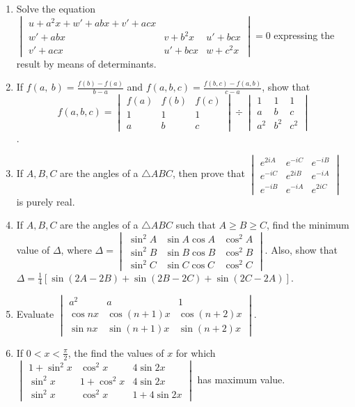 \begin{enumerate}[resume]
\item Solve the equation $\begin{vmatrix}u + a^2x + w' + abx + v' + acx\\w' + abx & v + b^2x & u' + bcx\\ v' + acx & u' + bcx & w
  + c^2x\end{vmatrix} = 0$ expressing the result by means of determinants.
\item If $f(a,\ b) = \frac{f(b) - f(a)}{b - a}$ and $f(a, b, c) = \frac{f(b, c) - f(a, b)}{c - a}$, show that $$f(a, b, c)
  = \begin{vmatrix}f(a) & f(b) & f(c)\\1 & 1 & 1\\a & b & c\end{vmatrix}\div\begin{vmatrix}1 & 1 & 1\\a & b & c\\a^2 & b^2 &
    c^2\end{vmatrix}$$.
\item If $A, B, C$ are the angles of a $\triangle ABC$, then prove that $\begin{vmatrix}e^{2iA} & e^{-iC} & e^{-iB}\\e^{-iC} &
  e^{2iB} & e^{-iA}\\e^{-iB} & e^{-iA} & e^{2iC}\end{vmatrix}$ is purely real.
\item If $A, B, C$ are the angles of a $\triangle ABC$ such that $A\geq B\geq C$, find the minimum value of $\Delta$, where
  $\Delta = \begin{vmatrix}\sin^2A & \sin A\cos A & \cos^2A\\\sin^2B & \sin B\cos B & \cos^2B\\\sin^2C & \sin C\cos C &
  \cos^2C\end{vmatrix}$. Also, show that $\Delta = \frac{1}{4}[\sin(2A - 2B) + \sin(2B - 2C) + \sin(2C - 2A)]$.
\item Evaluate $\begin{vmatrix}a^2 & a & 1\\\cos nx & \cos(n + 1)x & \cos(n + 2)x\\\sin nx & \sin(n + 1)x & \sin(n +
  2)x\end{vmatrix}$.
\item If $0<x<\frac{\pi}{2}$, the find the values of $x$ for which $\begin{vmatrix}1 + \sin^2x & \cos^2x & 4\sin2x\\\sin^2x & 1 +
  \cos^2x & 4\sin2x\\\sin^2x & \cos^2x & 1 + 4\sin2x\end{vmatrix}$ has maximum value.

\end{enumerate}
